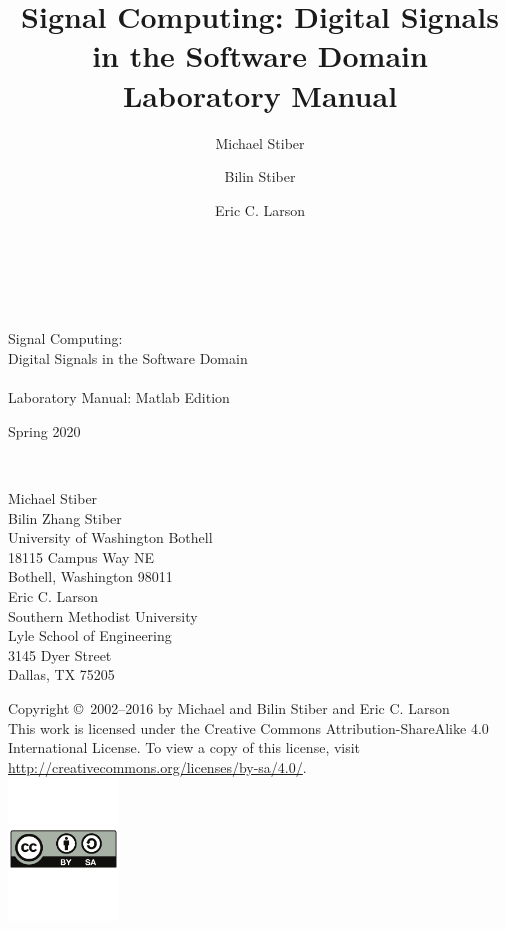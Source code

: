 \documentclass[12pt]{article}
\title{Signal Computing: Digital Signals in the Software
  Domain\\[2\parskip]
Laboratory Manual}
\author{Michael Stiber \and Bilin Stiber \and Eric C. Larson}
\begin{document}
\lstset{style=Matlab-editor}
\lstset{basicstyle=\mlttfamily}

\begin{titlepage}

\mbox{}\\[0.5in]
\begin{center}
\mbox{}\hrulefill\mbox{}\\[0.25in]
{\Huge Signal Computing:}\\[0.25in]
{\LARGE Digital Signals in the Software Domain}\\[0.25in]
\mbox{}\hrulefill\mbox{}\\[0.5in]
{\Huge Laboratory Manual: Matlab Edition}\\[2.5in]

\mbox{}\hfill
\parbox{1.5in}{\mbox{}}
\parbox{3in}{Spring 2020}\\[0.25in]
\mbox{}\hfill
\parbox{3in}{\raggedright
Michael Stiber\\
Bilin Zhang Stiber\\
University of Washington Bothell\\
18115 Campus Way NE\\
Bothell, Washington 98011\\[0.25in]
Eric C. Larson\\
Southern Methodist University\\
Lyle School of Engineering\\
3145 Dyer Street\\
Dallas, TX 75205}
\end{center}

\newpage
\mbox{}\vspace{4in}
\begin{flushright}
Copyright \copyright\ 2002--2016 by Michael and Bilin Stiber and Eric
C. Larson\\[2in]
This work is licensed under the Creative Commons
Attribution-ShareAlike 4.0 International License. To view a copy of
this license, visit
\url{http://creativecommons.org/licenses/by-sa/4.0/}.\\
\includegraphics[height=1.5in]{by-sa}
\end{flushright}

\thispagestyle{empty}

\end{titlepage}

\tableofcontents

\setcounter{section}{-1}








\end{document}
